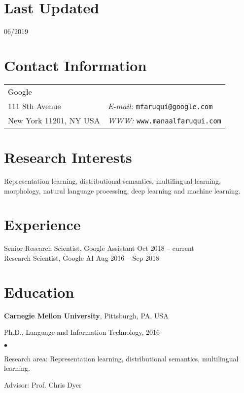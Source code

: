 \documentclass[margin,line]{res}
\newenvironment{list1}{
  \begin{list}{\ding{113}}{%
      \setlength{\itemsep}{0in}
      \setlength{\parsep}{0in} \setlength{\parskip}{0in}
      \setlength{\topsep}{0in} \setlength{\partopsep}{0in}
      \setlength{\leftmargin}{0.17in}}}{\end{list}}
\newenvironment{list2}{
  \begin{list}{$\bullet$}{%
      \setlength{\itemsep}{0in}
      \setlength{\parsep}{0in} \setlength{\parskip}{0in}
      \setlength{\topsep}{0in} \setlength{\partopsep}{0in}
      \setlength{\leftmargin}{0.2in}}}{\end{list}}
\begin{document}

\begin{resume}

\section{\sc Last Updated}

06/2019

\section{\sc Contact Information}
\vspace{.05in}
\begin{tabular}{@{}p{2in}p{4in}}
Google & \\
111 8th Avenue & {\it E-mail:}  \tt{mfaruqui@google.com}\\
New York 11201, NY USA &  {\it WWW:}  \tt{www.manaalfaruqui.com}\\
\end{tabular}

\section{\sc Research Interests}

Representation learning, distributional semantics, multilingual learning,
morphology, natural language processing, deep learning and machine learning.

\section{\sc Experience}
Senior Research Scientist, Google Assistant \hfill {Oct 2018 -- current}\\
Research Scientist, Google AI \hfill {Aug 2016 -- Sep 2018}

\section{\sc Education}
{\bf Carnegie Mellon University}, Pittsburgh, PA, USA\\
\vspace*{-.1in}
\begin{list1}
\item[] Ph.D., Language and Information Technology, 2016
\begin{list2}
\vspace*{.05in}
\item Research area: Representation learning, distributional semantics, multilingual learning.
\item Advisor:  Prof. Chris Dyer
\end{list2}
\end{list1}


\end{resume}
\end{document}

